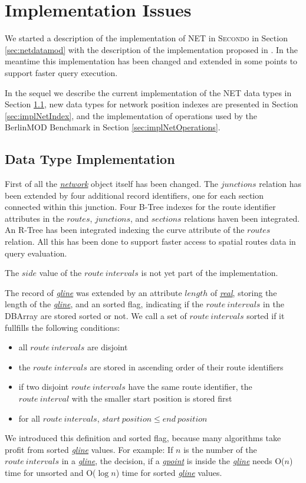 \documentclass[a4paper]{article}
\newcommand{\secondo}{\textsc{Secondo}}
\newcommand{\bmodb} {BerlinMOD Benchmark}
\newcommand{\dt}[1]{\textsl{\underline{#1}}}
\begin{document}
\section{Implementation Issues}
\label{sec:implNDM}
We started a description of the implementation of NET in \secondo{} in Section
\ref{sec:netdatamod} with the description of the implementation proposed in
\cite{NetworkGueting}. In the meantime this implementation has been changed and
extended in some points to support faster query execution.

In the sequel we describe the current implementation of the NET data types in
Section \ref{sec:implNetDataTyp}, new data types for network position indexes
are presented in Section \ref{sec:implNetIndex}, and the implementation of
operations used by the \bmodb{} in Section \ref{sec:implNetOperations}.

\subsection{Data Type Implementation}
\label{sec:implNetDataTyp}
First of all the \dt{network} object itself has been changed. The $junctions$
relation has been extended by four additional record identifiers, one for each
section connected within this junction. Four B-Tree indexes for the route
identifier attributes in the $routes$, $junctions$, and $sections$ relations
haven been integrated. An R-Tree has been integrated indexing the curve attribute
of the $routes$ relation. All this has been done to support faster access to
spatial routes data in query evaluation.

The $side$ value of the $route\ intervals$ is not yet part of the implementation.

\label{sec:sortedgline}
The record of \dt{gline} was extended by an attribute $length$ of
\dt{real}, storing the length of the \dt{gline}, and an sorted flag, indicating
if the $route\ intervals$ in the DBArray are stored sorted or not. We call a
set of $route\ intervals$ sorted if it fullfills the following conditions:
\begin{itemize}
   \item all $route\ intervals$ are disjoint
   \item the $route\ intervals$ are stored in ascending order of their route identifiers
   \item if two disjoint $route\ intervals$ have the same route identifier, the
$route\ interval$ with the smaller start position is stored first
   \item for all $route\ intervals$, $start\ position \le end\ position$
\end{itemize}
We introduced this definition and sorted flag, because many algorithms take profit
from sorted \dt{gline} values. For example: If $n$ is the number of the
$route\ intervals$ in a \dt{gline}, the decision, if a \dt{gpoint} is inside
the \dt{gline} needs O($n$) time for unsorted and O($\log n$) time for sorted
\dt{gline} values.
\end{document}
